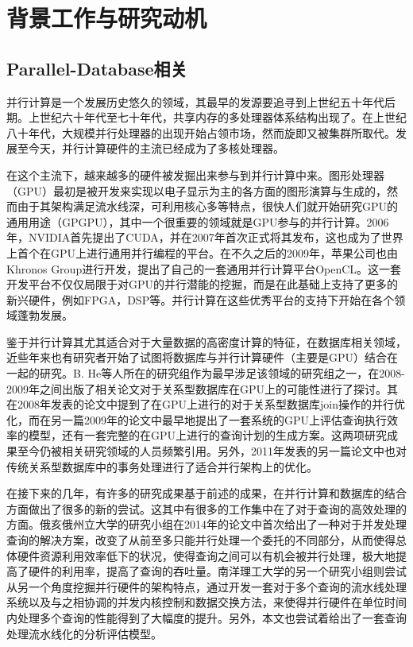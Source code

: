 \chapter{背景工作与研究动机}
\section{Parallel-Database相关}

并行计算是一个发展历史悠久的领域，其最早的发源要追寻到上世纪五十年代后期。上世纪六十年代至七十年代，共享内存的多处理器体系结构出现了。在上世纪八十年代，大规模并行处理器的出现开始占领市场，然而旋即又被集群所取代。发展至今天，并行计算硬件的主流已经成为了多核处理器\cite{ManycoreShift}。

在这个主流下，越来越多的硬件被发掘出来参与到并行计算中来。图形处理器（GPU）最初是被开发来实现以电子显示为主的各方面的图形演算与生成的，然而由于其架构满足流水线深，可利用核心多等特点，很快人们就开始研究GPU的通用用途（GPGPU），其中一个很重要的领域就是GPU参与的并行计算。2006年，NVIDIA首先提出了CUDA，并在2007年首次正式将其发布，这也成为了世界上首个在GPU上进行通用并行编程的平台\cite{cudaofficial}\cite{CUDA}。在不久之后的2009年，苹果公司也由Khronos Group进行开发，提出了自己的一套通用并行计算平台OpenCL\cite{OpenCL}。这一套开发平台不仅仅局限于对GPU的并行潜能的挖掘，而是在此基础上支持了更多的新兴硬件，例如FPGA，DSP等。并行计算在这些优秀平台的支持下开始在各个领域蓬勃发展。

鉴于并行计算其尤其适合对于大量数据的高密度计算的特征，在数据库相关领域，近些年来也有研究者开始了试图将数据库与并行计算硬件（主要是GPU）结合在一起的研究。B. He等人所在的研究组作为最早涉足该领域的研究组之一，在2008-2009年之间出版了相关论文对于关系型数据库在GPU上的可能性进行了探讨。其在2008年发表的论文\cite{heSIGMOD2008}中提到了在GPU上进行的对于关系型数据库join操作的并行优化，而在另一篇2009年的论文中\cite{heACMTDS2009}最早地提出了一套系统的GPU上评估查询执行效率的模型，还有一套完整的在GPU上进行的查询计划的生成方案。这两项研究成果至今仍被相关研究领域的人员频繁引用。另外，2011年发表的另一篇论文\cite{heVLDB2011}中也对传统关系型数据库中的事务处理进行了适合并行架构上的优化。

在接下来的几年，有许多的研究成果基于前述的成果，在并行计算和数据库的结合方面做出了很多的新的尝试。这其中有很多的工作集中在了对于查询的高效处理的方面。俄亥俄州立大学的研究小组在2014年的论文\cite{wangVLDB2014}中首次给出了一种对于并发处理查询的解决方案，改变了从前至多只能并行处理一个委托的不同部分，从而使得总体硬件资源利用效率低下的状况，使得查询之间可以有机会被并行处理，极大地提高了硬件的利用率，提高了查询的吞吐量。南洋理工大学的另一个研究小组\cite{johnsSIGMOD2016}则尝试从另一个角度挖掘并行硬件的架构特点，通过开发一套对于多个查询的流水线处理系统以及与之相协调的并发内核控制和数据交换方法，来使得并行硬件在单位时间内处理多个查询的性能得到了大幅度的提升。另外，本文也尝试着给出了一套查询处理流水线化的分析评估模型。

